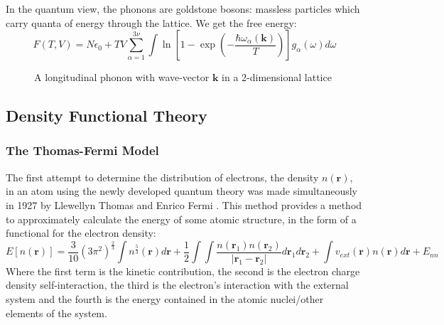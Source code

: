 \documentclass[12pt]{article}
\begin{document}
In the quantum view, the phonons are goldstone bosons: massless particles which carry quanta of energy through the lattice. We get the free energy:
\begin{equation}
	F(T, V) = N\epsilon_0 + TV\sum_{\alpha=1}^{3\nu}\int \ln \left[ 1-\exp\left(-\frac{\hbar \omega_\alpha(\mathbf k)}{T}\right)\right]g_\alpha(\omega)d\omega
\end{equation}

\begin{figure}
\centering
{}
\label{fig:phonon:disturbance}
\caption{A longitudinal phonon with wave-vector $\mathbf k$ in a 2-dimensional lattice}
\end{figure}

\subsection{Density Functional Theory}
\subsubsection{The Thomas-Fermi Model}
The first attempt to determine the distribution of electrons, the density $n(\mathbf r)$, in an atom using the newly developed quantum theory was made simultaneously in 1927 by Llewellyn Thomas \cite{thomas_1927} and Enrico Fermi \cite{fermi1927metodo}. This method provides a method to approximately calculate the energy of some atomic structure, in the form of a functional for the electron density:
\begin{equation}\label{eq:thomas-fermi}
	E[n(\mathbf r)] = \frac{3}{10}(3\pi^2)^{\frac{2}{3}}\int n^{\frac{5}{3}}(\mathbf r) d \mathbf r + \frac{1}{2}\int\int\frac{n(\mathbf r_1) n(\mathbf r_2)}{\left| \mathbf r_1 - \mathbf r_2\right|}d\mathbf r_1 d\mathbf r_2 + \int v_{ext}(\mathbf r) n(\mathbf r) d \mathbf r + E_{nn}
\end{equation}
Where the first term is the kinetic contribution, the second is the electron charge density self-interaction, the third is the electron's interaction with the external system and the fourth is the energy contained in the atomic nuclei/other elements of the system.
\end{document}
